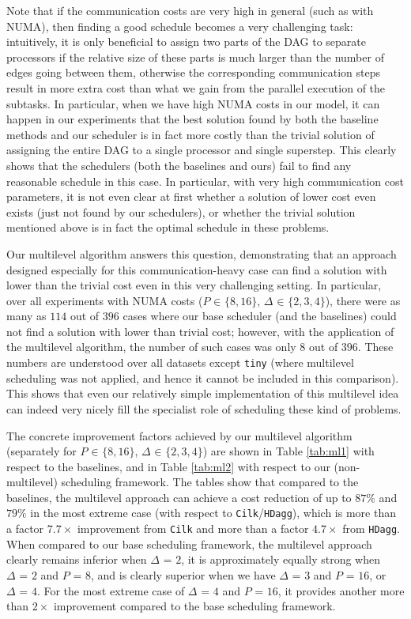 \documentclass[sigconf,nonacm]{acmart}
\begin{document}
Note that if the communication costs are very high in general (such as with NUMA), then finding a good schedule becomes a very challenging task: intuitively, it is only beneficial to assign two parts of the DAG to separate processors if the relative size of these parts is much larger than the number of edges going between them, otherwise the corresponding communication steps result in more extra cost than what we gain from the parallel execution of the subtasks. In particular, when we have high NUMA costs in our model, it can happen in our experiments that the best solution found by both the baseline methods and our scheduler is in fact more costly than the trivial solution of assigning the entire DAG to a single processor and single superstep. This clearly shows that the schedulers (both the baselines and ours) fail to find any reasonable schedule in this case. In particular, with very high communication cost parameters, it is not even clear at first whether a solution of lower cost even exists (just not found by our schedulers), or whether the trivial solution mentioned above is in fact the optimal schedule in these problems.

Our multilevel algorithm answers this question, demonstrating that an approach designed especially for this communication-heavy case can find a solution with lower than the trivial cost even in this very challenging setting. In particular, over all experiments with NUMA costs ($P _{\!} \in _{\!} \{ 8, 16\}$, $\Delta _{\!} \in _{\!} \{ 2, 3, 4\}$), there were as many as $114$ out of $396$ cases where our base scheduler (and the baselines) could not find a solution with lower than trivial cost; however, with the application of the multilevel algorithm, the number of such cases was only $8$ out of $396$. These numbers are understood over all datasets except \texttt{tiny} (where multilevel scheduling was not applied, and hence it cannot be included in this comparison). This shows that even our relatively simple implementation of this multilevel idea can indeed very nicely fill the specialist role of scheduling these kind of problems.

The concrete improvement factors achieved by our multilevel algorithm (separately for $P _{\!} \in _{\!} \{ 8, 16\}$, $\Delta _{\!} \in _{\!} \{ 2, 3, 4\}$) are shown in Table \ref{tab:ml1} with respect to the baselines, and in Table \ref{tab:ml2} with respect to our (non-multilevel) scheduling framework. The tables show that compared to the baselines, the multilevel approach can achieve a cost reduction of up to $87\%$ and $79\%$ in the most extreme case (with respect to \texttt{Cilk}/\texttt{HDagg}), which is more than a factor $7.7\times$ improvement from \texttt{Cilk} and more than a factor $4.7\times$ from \texttt{HDagg}. When compared to our base scheduling framework, the multilevel approach clearly remains inferior when $\Delta_{\!}=_{\!}2$, it is approximately equally strong when $\Delta_{\!}=_{\!}2$ and $P_{\!}=_{\!}8$, and is clearly superior when we have $\Delta_{\!}=_{\!}3$ and $P_{\!}=_{\!}16$, or $\Delta_{\!}=_{\!}4$. For the most extreme case of $\Delta_{\!}=_{\!}4$ and $P_{\!}=_{\!}16$, it provides another more than $2\times$ improvement compared to the base scheduling framework.
\end{document}
